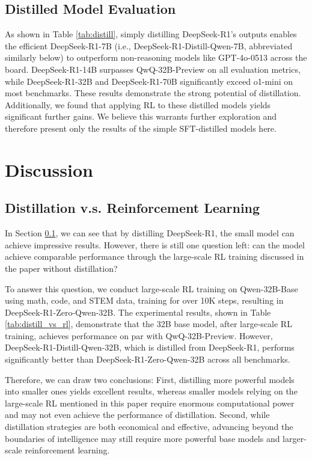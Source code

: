 \documentclass[11pt, a4paper, logo, copyright, nonumbering]{deepseek}
\begin{document}
\subsection{Distilled Model Evaluation}
\label{sec:distilled_model_evaluation}


As shown in Table \ref{tab:distill}, simply distilling DeepSeek-R1's outputs enables the efficient DeepSeek-R1-7B (i.e., DeepSeek-R1-Distill-Qwen-7B, abbreviated similarly below) to outperform non-reasoning models like GPT-4o-0513 across the board.
DeepSeek-R1-14B surpasses QwQ-32B-Preview on all evaluation metrics, while DeepSeek-R1-32B and DeepSeek-R1-70B significantly exceed o1-mini on most benchmarks.
These results demonstrate the strong potential of distillation.
Additionally, we found that applying RL to these distilled models yields significant further gains. We believe this warrants further exploration and therefore present only the results of the simple SFT-distilled models here.


\section{Discussion}
\subsection{Distillation v.s. Reinforcement Learning}


In Section \ref{sec:distilled_model_evaluation}, we can see that by distilling DeepSeek-R1, the small model can achieve impressive results. However, there is still one question left: can the model achieve comparable performance through the large-scale RL training discussed in the paper without distillation?


To answer this question, we conduct large-scale RL training on Qwen-32B-Base using math, code, and STEM data, training for over 10K steps, resulting in DeepSeek-R1-Zero-Qwen-32B. The experimental results, shown in Table \ref{tab:distill_vs_rl}, demonstrate that the 32B base model, after large-scale RL training, achieves performance on par with QwQ-32B-Preview. However, DeepSeek-R1-Distill-Qwen-32B, which is distilled from DeepSeek-R1,  performs significantly better than DeepSeek-R1-Zero-Qwen-32B across all benchmarks.

Therefore, we can draw two conclusions: First, distilling more powerful models into smaller ones yields excellent results, whereas smaller models relying on the large-scale RL mentioned in this paper require enormous computational power and may not even achieve the performance of distillation. Second, while distillation strategies are both economical and effective, advancing beyond the boundaries of intelligence may still require more powerful base models and larger-scale reinforcement learning.
\end{document}
